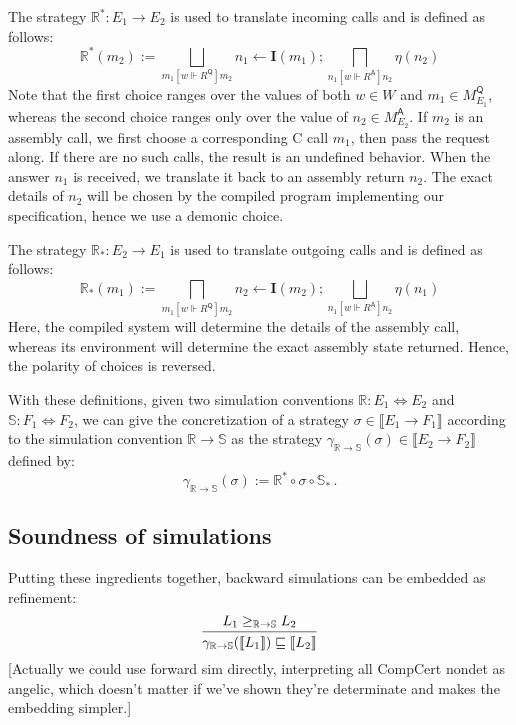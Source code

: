 \documentclass[format=sigplan,authordraft]{acmart}
\newcommand{\kw}[1]{\ensuremath{\mathsf{#1}}}
\newcommand{\ifr}[1]{\mathrel{[{#1}]}}
\begin{document}
The strategy $\mathbb{R}^* : E_1 \rightarrow E_2$
is used to translate incoming calls
and is defined as follows:
\[
    \mathbb{R}^*(m_2) :=
       \bigsqcup_{m_1 \ifr{w \Vdash R^\kw{Q}} m_2}
       n_1 \leftarrow \mathbf{I}(m_1) ;
       \bigsqcap_{n_1 \ifr{w \Vdash R^\kw{A}} n_2}
       \eta(n_2)
\]
Note that the first choice ranges over the values of both
$w \in W$ and $m_1 \in M_{E_1}^\kw{Q}$,
whereas the second choice ranges only over the value of
$n_2 \in M_{E_2}^\kw{A}$.
If $m_2$ is an assembly call,
we first choose a corresponding C call $m_1$,
then pass the request along.
If there are no such calls,
the result is an undefined behavior.
When the answer $n_1$ is received,
we translate it back to an assembly return $n_2$.
The exact details of $n_2$ will be chosen by
the compiled program implementing our specification,
hence we use a demonic choice.

The strategy $\mathbb{R}_* : E_2 \rightarrow E_1$
is used to translate outgoing calls
and is defined as follows:
\[
    \mathbb{R}_*(m_1) :=
       \bigsqcap_{m_1 \ifr{w \Vdash R^\kw{Q}} m_2}
       n_2 \leftarrow \mathbf{I}(m_2) ;
       \bigsqcup_{n_1 \ifr{w \Vdash R^\kw{A}} n_2}
       \eta(n_1)
\]
Here,
the compiled system will determine
the details of the assembly call,
whereas its environment will determine
the exact assembly state returned.
Hence, the polarity of choices is reversed.

With these definitions,
given two simulation conventions
$\mathbb{R} : E_1 \Leftrightarrow E_2$ and
$\mathbb{S} : F_1 \Leftrightarrow F_2$,
we can give the concretization of a strategy
$\sigma \in \llbracket E_1 \rightarrow F_1 \rrbracket$
according to the simulation convention
$\mathbb{R} \rightarrow \mathbb{S}$
as the strategy
$\gamma_{\mathbb{R} \rightarrow \mathbb{S}}(\sigma) \in
  \llbracket E_2 \rightarrow F_2 \rrbracket$
defined by:
\[
    \gamma_{\mathbb{R} \rightarrow \mathbb{S}}(\sigma) :=
    \mathbb{R}^* \circ \sigma \circ \mathbb{S}_* \,.
\]


\subsection{Soundness of simulations} %

Putting these ingredients together,
backward simulations can be embedded as refinement:
\[
  \begin{prooftree}
    \hypo{L_1 \ge_{\mathbb{R} \rightarrow \mathbb{S}} L_2}
    \infer1{\gamma_{\mathbb{R} \rightarrow \mathbb{S}}
                (\llbracket L_1 \rrbracket) \sqsubseteq
                \llbracket L_2 \rrbracket}
  \end{prooftree}
\]
[Actually we could use forward sim directly,
interpreting all CompCert nondet as angelic,
which doesn't matter if we've shown they're determinate
and makes the embedding simpler.]
\end{document}
